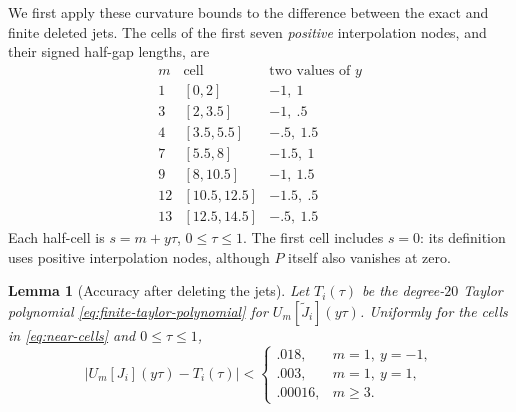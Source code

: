 \documentclass[11pt]{article}
\newtheorem{lemma}[theorem]{Lemma}
\theoremstyle{remark}\newtheorem{remark}[theorem]{Remark}
\begin{document}
We first apply these curvature bounds to the difference between the exact
and finite deleted jets. The cells of the first seven \emph{positive}
interpolation nodes, and their signed half-gap lengths, are
\begin{equation}\label{eq:near-cells}
\begin{array}{c|c|c}
m&\text{cell}&\text{two values of }y\\\hline
1 &[0,2]&-1,\ 1\\
3 &[2,3.5]&-1,\ .5\\
4 &[3.5,5.5]&-.5,\ 1.5\\
7 &[5.5,8]&-1.5,\ 1\\
9 &[8,10.5]&-1,\ 1.5\\
12&[10.5,12.5]&-1.5,\ .5\\
13&[12.5,14.5]&-.5,\ 1.5
\end{array}
\end{equation}
Each half-cell is $s=m+y\tau$, $0\le\tau\le1$.  The first cell
includes $s=0$: its definition uses positive interpolation nodes,
although $P$ itself also vanishes at zero.

\begin{lemma}[Accuracy after deleting the jets]\label{lem:deleted-jets}
Let $T_i(\tau)$ be the degree-$20$ Taylor polynomial
\eqref{eq:finite-taylor-polynomial} for
$U_m[\widetilde J_i](y\tau)$.  Uniformly for the cells in
\eqref{eq:near-cells} and $0\le\tau\le1$,
\begin{equation}\label{eq:deleted-jet-error}
 |U_m[J_i](y\tau)-T_i(\tau)|<
 \begin{cases}
 .018,&m=1,\ y=-1,\\
 .003,&m=1,\ y=1,\\
 .00016,&m\ge3.
 \end{cases}
\end{equation}
\end{lemma}
\end{document}

